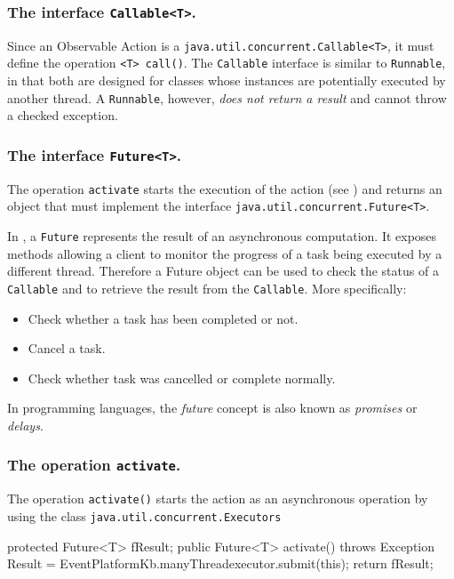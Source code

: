  

\subsubsection{The interface \texttt{Callable<T>}.\\}
Since an Observable Action is a \texttt{java.util.concurrent.Callable<T>}, it must define the operation \texttt{<T> call()}.
The \texttt{Callable} interface is similar to \texttt{Runnable}, in that both are designed for classes whose instances are potentially executed by another thread. A \texttt{Runnable}, however, \textit{does not return a result} and cannot throw a checked exception.

\subsubsection{The interface \texttt{Future<T>}.\\}

The operation \texttt{activate} starts the execution of the action (see ) and returns an object that must implement the interface \texttt{java.util.concurrent.Future<T>}. 

In \java{}, a \texttt{Future} represents the result of an asynchronous computation. It exposes methods allowing a client to monitor the progress of a task being executed by a different thread. Therefore a Future object can be used to check the status of a \texttt{Callable} and to retrieve the result from the \texttt{Callable}. More specifically:
\begin{itemize}
\item Check whether a task has been completed or not.
\item  Cancel a task.
\item Check whether task was cancelled or complete normally.
\end{itemize}
 
In programming languages, the \textit{future} concept is also known as \textit{promises} or \textit{delays}.


\subsubsection{The operation \texttt{activate}.\\}

The operation \texttt{activate()} starts the action as an asynchronous operation by using the class \texttt{java.util.concurrent.Executors}
\begin{javacode}
protected Future<T>  fResult;
	public Future<T> activate() throws Exception{
		Result = EventPlatformKb.manyThreadexecutor.submit(this);	
 		return fResult;
 	}
\end{javacode} 

